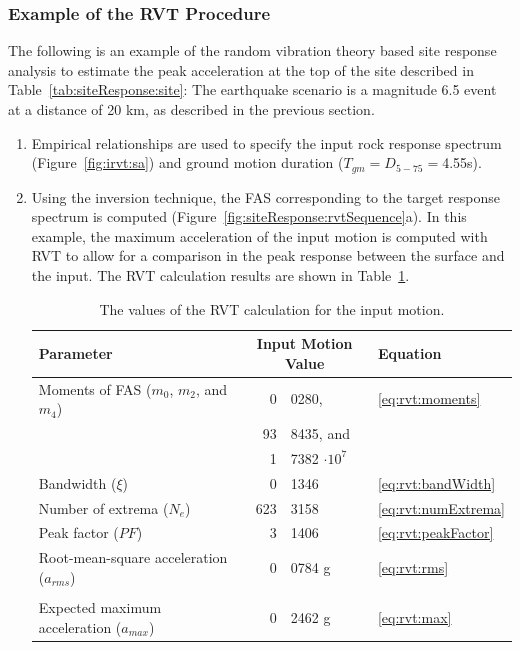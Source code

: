 \documentclass[12pt,oneside]{book}
\begin{document}
\subsubsection{Example of the RVT Procedure}
The following is an example of the random vibration theory based site response analysis to estimate
the peak acceleration at the top of the site described in Table~\ref{tab:siteResponse:site}:  The
earthquake scenario is a magnitude 6.5 event at a distance of 20 km, as described in the previous
section.
\begin{enumerate}
    \item Empirical relationships are used to specify the input rock response spectrum
        (Figure~\ref{fig:irvt:sa}) and ground motion duration ($T_{gm}=D_{5-75}=$4.55s).
    \item Using the inversion technique, the FAS corresponding to the target response spectrum is
        computed (Figure~\ref{fig:siteResponse:rvtSequence}a). In this example, the maximum acceleration
        of the input motion is computed with RVT to allow for a comparison in the peak response between the surface and the
        input.  The RVT calculation results are shown in Table~\ref{tab:rvtSequence:input}.

        \begin{table}[h]
            \centering
            \begin{tabular}{l r @{.} l l}
                \hline\hline
                \textbf{Parameter} & \multicolumn{2}{c}{\textbf{Input Motion Value}} & \textbf{Equation} \\
                \hline
                Moments of FAS ($m_0$, $m_2$, and $m_4$) & 0&0280, & \ref{eq:rvt:moments} \\
                                                         & 93&8435, and \\
                                                         & 1&7382 $\cdot 10^7$  \\
                Bandwidth ($\xi$) & 0&1346 & \ref{eq:rvt:bandWidth} \\
                Number of extrema ($N_e$) & 623&3158 & \ref{eq:rvt:numExtrema} \\
                Peak factor ($PF$) & 3&1406 & \ref{eq:rvt:peakFactor} \\
                Root-mean-square acceleration ($a_{rms}$) & 0&0784 g & \ref{eq:rvt:rms} \\
                \\
                Expected maximum acceleration ($a_{max}$) & 0&2462 g & \ref{eq:rvt:max} \\
                \hline\hline
            \end{tabular}
            \caption{The values of the RVT calculation for the input motion.}
            \label{tab:rvtSequence:input}
        \end{table}


\end{enumerate}
\end{document}
